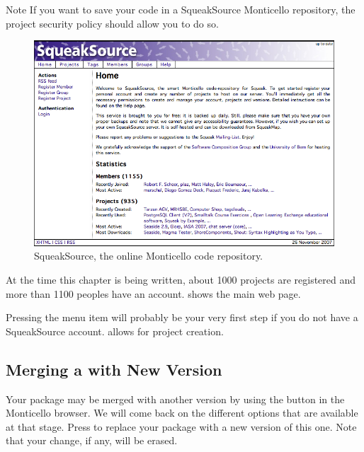 \documentclass[a4paper,10pt,twoside]{book}
\begin{document}
Note If you want to save your code in a SqueakSource Monticello repository, the project security policy should allow you to do so.



\begin{figure}[ht]\centering
	\includegraphics[width=.75\linewidth]{squeaksource2}
	\caption{SqueakSource, the online Monticello code repository.}
\end{figure}

At the time this chapter is being written, about 1000 projects are registered and more than 1100 peoples have an account.  shows the main web page.

Pressing the  menu item will probably be your very first step if you do not have a SqueakSource account.  allows for project creation. 


\subsection{Merging a with New Version}

Your package may be merged with another version by using the  button in the Monticello browser. We will come back on the different options that are available at that stage. Press  to replace your package with a new version of this one. Note that your change, if any, will be erased.
\end{document}
